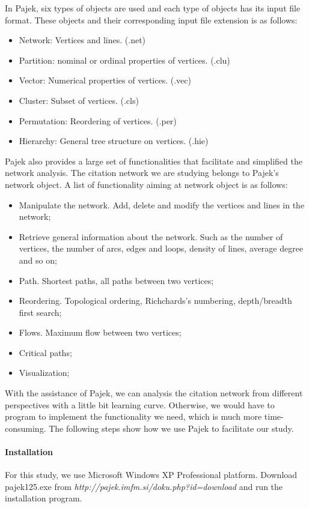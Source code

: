 In Pajek, six types of objects are used and each type of objects has its input file format. These objects and their corresponding input file extension is as follows:
\begin{itemize}
\item Network: Vertices and lines. (.net)
\item Partition: nominal or ordinal properties of vertices. (.clu)
\item Vector: Numerical properties of vertices. (.vec)
\item Cluster: Subset of vertices. (.cls)
\item Permutation: Reordering of vertices. (.per)
\item Hierarchy: General tree structure on vertices. (.hie)
\end{itemize} 

Pajek also provides a large set of functionalities that facilitate and simplified the network analysis. The citation network we are studying belongs to Pajek's network object. A list of functionality aiming at network object is as follows: 
\begin{itemize}
\item Manipulate the network. Add, delete and modify the vertices and lines in the network;
\item Retrieve general information about the network. Such as the number of vertices, the number of arcs, edges and loops, density of lines, average degree and so on;
\item Path. Shortest paths, all paths between two vertices;
\item Reordering. Topological ordering, Richchards's numbering, depth/breadth first search;
\item Flows. Maximum flow between two vertices;
\item Critical paths;
\item Visualization;
\end{itemize}

With the assistance of Pajek, we can analysis the citation network from different perspectives with a little bit learning curve. Otherwise, we would have to program to implement the functionality we need, which is much more time-consuming. The following steps show how we use Pajek to facilitate our study.

\paragraph{Installation}
For this study, we use Microsoft Windows XP Professional platform. Download pajek125.exe from {\em http://pajek.imfm.si/doku.php?id=download} and run the installation program.
